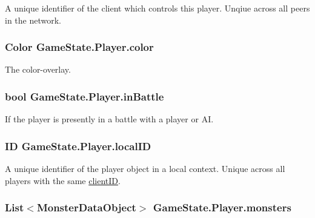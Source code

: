 A unique identifier of the client which controls this player. Unqiue across all peers in the network. 

\hypertarget{class_game_state_1_1_player_a38366fae101c03655d90443f174e362d}{
\subsubsection[{color}]{\setlength{\rightskip}{0pt plus 5cm}Color Game\-State.\-Player.\-color}}\label{class_game_state_1_1_player_a38366fae101c03655d90443f174e362d}


The color-\/overlay. 

\hypertarget{class_game_state_1_1_player_a3cff343fceb3dc315d2371fc8fe25ec6}{
\subsubsection[{in\-Battle}]{\setlength{\rightskip}{0pt plus 5cm}bool Game\-State.\-Player.\-in\-Battle}}\label{class_game_state_1_1_player_a3cff343fceb3dc315d2371fc8fe25ec6}


If the player is presently in a battle with a player or A\-I. 

\hypertarget{class_game_state_1_1_player_ae0383475b3348fb85ba5be64433443ff}{
\subsubsection[{local\-I\-D}]{\setlength{\rightskip}{0pt plus 5cm}I\-D Game\-State.\-Player.\-local\-I\-D}}\label{class_game_state_1_1_player_ae0383475b3348fb85ba5be64433443ff}


A unique identifier of the player object in a local context. Unique across all players with the same \hyperlink{class_game_state_1_1_player_aacc123df8ea5256f83c1060a5fdd19c2}{client\-I\-D}. 

\hypertarget{class_game_state_1_1_player_a4412b3835e68a55b00610438118cdb16}{
\subsubsection[{monsters}]{\setlength{\rightskip}{0pt plus 5cm}List$<${\bf Monster\-Data\-Object}$>$ Game\-State.\-Player.\-monsters}}\label{class_game_state_1_1_player_a4412b3835e68a55b00610438118cdb16}


